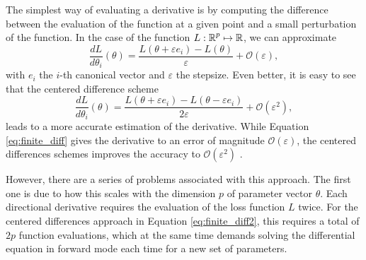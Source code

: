The simplest way of evaluating a derivative is by computing the difference between the evaluation of the function at a given point and a small perturbation of the function. 
In the case of the function $L : \operatorname{\mathbb{R}}^p \mapsto \operatorname{\mathbb{R}}$, we can approximate
\begin{equation}
 \frac{dL}{d\theta_i} (\theta) = \frac{L(\theta + \varepsilon e_i ) - L(\theta)}{\varepsilon} + \mathcal O (\varepsilon),
 \label{eq:finite_diff}
\end{equation}
with $e_i$ the $i$-th canonical vector and $\varepsilon$ the stepsize. 
Even better, it is easy to see that the centered difference scheme
\begin{equation}
 \frac{dL}{d\theta_i} (\theta) 
 =
 \frac{L(\theta + \varepsilon e_i ) - L(\theta - \varepsilon e_i)}{2\varepsilon}
 + \mathcal O (\varepsilon^2),
 \label{eq:finite_diff2}
\end{equation}
leads to a more accurate estimation of the derivative. 
While Equation \eqref{eq:finite_diff} gives the derivative to an error of magnitude $\mathcal O (\varepsilon)$, the centered differences schemes improves the accuracy to $\mathcal O (\varepsilon^2)$ \cite{ascher2008-numerical-methods}. 
 
However, there are a series of problems associated with this approach.
The first one is due to how this scales with the dimension $p$ of parameter vector $\theta$.
Each directional derivative requires the evaluation of the loss function $L$ twice.
For the centered differences approach in Equation \eqref{eq:finite_diff2}, this requires a total of $2p$ function evaluations, which at the same time demands solving the differential equation in forward mode each time for a new set of parameters.

